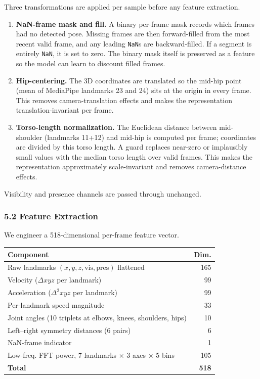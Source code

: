 \documentclass[
  11pt,
]{article}
\providecommand{\tightlist}{%
  \setlength{\itemsep}{0pt}\setlength{\parskip}{0pt}}
\begin{document}
Three transformations are applied per sample before any feature
extraction.

\begin{enumerate}
\def\labelenumi{\arabic{enumi}.}
\tightlist
\item
  \textbf{NaN-frame mask and fill.} A binary per-frame mask records
  which frames had no detected pose. Missing frames are then
  forward-filled from the most recent valid frame, and any leading
  \texttt{NaN}s are backward-filled. If a segment is entirely
  \texttt{NaN}, it is set to zero. The binary mask itself is preserved
  as a feature so the model can learn to discount filled frames.
\item
  \textbf{Hip-centering.} The 3D coordinates are translated so the
  mid-hip point (mean of MediaPipe landmarks 23 and 24) sits at the
  origin in every frame. This removes camera-translation effects and
  makes the representation translation-invariant per frame.
\item
  \textbf{Torso-length normalization.} The Euclidean distance between
  mid-shoulder (landmarks 11+12) and mid-hip is computed per frame;
  coordinates are divided by this torso length. A guard replaces
  near-zero or implausibly small values with the median torso length
  over valid frames. This makes the representation approximately
  scale-invariant and removes camera-distance effects.
\end{enumerate}

Visibility and presence channels are passed through unchanged.

\subsubsection{5.2 Feature Extraction}\label{feature-extraction}

We engineer a 518-dimensional per-frame feature vector.

\begin{longtable}[]{@{}lr@{}}
\toprule\noalign{}
Component & Dim. \\
\midrule\noalign{}
\endhead
\bottomrule\noalign{}
\endlastfoot
Raw landmarks \((x,y,z,\text{vis},\text{pres})\) flattened & 165 \\
Velocity (\(\Delta xyz\) per landmark) & 99 \\
Acceleration (\(\Delta^2 xyz\) per landmark) & 99 \\
Per-landmark speed magnitude & 33 \\
Joint angles (10 triplets at elbows, knees, shoulders, hips) & 10 \\
Left--right symmetry distances (6 pairs) & 6 \\
NaN-frame indicator & 1 \\
Low-freq. FFT power, 7 landmarks × 3 axes × 5 bins & 105 \\
\textbf{Total} & \textbf{518} \\
\end{longtable}
\end{document}
